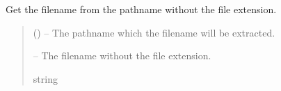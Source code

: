 \documentclass[letterpaper,11pt,english]{sphinxmanual}
\begin{document}
\begin{savenotes}\begin{fulllineitems}
\label{\detokenize{code/opihiexarata.library.path:opihiexarata.library.path.get_filename_without_extension}}
\pysigstartsignatures
{}
\pysigstopsignatures
\sphinxAtStartPar
Get the filename from the pathname without the file extension.
\begin{quote}\begin{description}
\sphinxAtStartPar
{} () – The pathname which the filename will be extracted.

\sphinxAtStartPar
{} – The filename without the file extension.

\sphinxAtStartPar
string

\end{description}\end{quote}

\end{fulllineitems}\end{savenotes}

\end{document}
